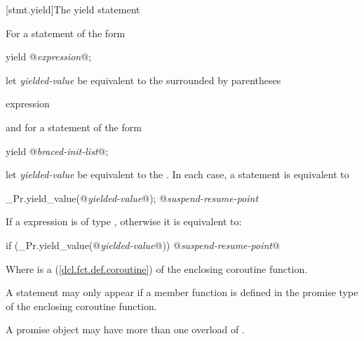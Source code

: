 %

[stmt.yield]{The yield statement}%

\pnum
For a  statement of the form

\begin{codeblock}
  yield @\textit{expression}@;
\end{codeblock}

let \textit{yielded-value} be equivalent to the  surrounded
by parentheses

\begin{ncbnf}
  \terminal{(} expression \terminal{)}
\end{ncbnf}

and for a  statement of the form

\begin{codeblock}
  yield @\textit{braced-init-list}@;
\end{codeblock}

let \textit{yielded-value} be equivalent to the . In each case,
a  statement is equivalent to

\begin{codeblock}
  _Pr.yield_value(@\textit{yielded-value}@);
  @\textit{suspend-resume-point}
\end{codeblock}

If a  expression is of type , otherwise it is equivalent to:

\begin{codeblock}
  if (_Pr.yield_value(@\textit{yielded-value}@)) {
    @\textit{suspend-resume-point}@
  }
\end{codeblock}

Where  is a  (\ref{dcl.fct.def.coroutine}) of the enclosing coroutine function.

\pnum
A  statement may only appear if a  member
function is defined in the promise type of the enclosing coroutine function.

\pnum
A promise object may have more than one overload of .

